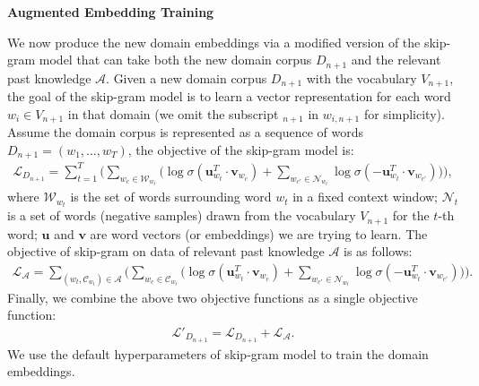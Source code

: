 \textbf{Augmented Embedding Training}
\label{chap3:sec:aet}

We now produce the new domain embeddings via a modified version of the skip-gram model \cite{mikolov2013distributed} that can take both the new domain corpus $D_{n+1}$ and the relevant past knowledge $\mathcal{A}$.
Given a new domain corpus $D_{n+1}$ with the vocabulary $V_{n+1}$, the goal of the skip-gram model is to learn a vector representation for each word $w_{i} \in V_{n+1}$ in that domain
(we omit the subscript $_{n+1}$ in $w_{i, n+1}$ for simplicity).
Assume the domain corpus is represented as a sequence of words $D_{n+1}=(w_1, \dots, w_T)$, the objective of the skip-gram model is:
\begin{equation}
\label{chap3:eq:sg}
\begin{split}
\mathcal{L}_{D_{n+1}} =\sum_{t=1}^{T} \big( \sum_{w_c \in \mathcal{W}_{w_{t}} } \big(\log \sigma (\bm{u}_{w_t}^T\cdot \bm{v}_{w_c})
+ \sum_{w_{c'} \in \mathcal{N}_{w_t} } \log \sigma(-\bm{u}_{w_t}^T\cdot \bm{v}_{w_{c'}} ) \big) \big) , 
\end{split}
\end{equation}
where $\mathcal{W}_{w_t}$ is the set of words surrounding word $w_t$ in a fixed context window;
$\mathcal{N}_t$ is a set of words (negative samples) drawn from the vocabulary $V_{n+1}$ for the $t$-th word;
$\bm{u}$ and $\bm{v}$ are word vectors (or embeddings) we are trying to learn.
The objective of skip-gram on data of relevant past knowledge $\mathcal{A}$ is as follows:
\begin{equation}
\begin{split}
\mathcal{L}_{\mathcal{A}}=\sum_{(w_t, \mathcal{C}_{w_t} ) \in \mathcal{A}} \big( \sum_{w_c \in \mathcal{C}_{w_t}} \big( \log \sigma (\bm{u}_{w_t}^T\cdot \bm{v}_{w_c})
+ \sum_{w_{c'} \in \mathcal{N}_{w_t} } \log \sigma(-\bm{u}_{w_t}^T\cdot \bm{v}_{w_{c'}} ) \big) \big).
\end{split}
\end{equation}
Finally, we combine the above two objective functions as a single objective function:\\
\begin{equation}
\begin{split}
\mathcal{L}'_{D_{n+1}}=\mathcal{L}_{D_{n+1}} + \mathcal{L}_{\mathcal{A}}.
\end{split}
\end{equation}
We use the default hyperparameters of skip-gram model \cite{mikolov2013distributed} to train the domain embeddings.

